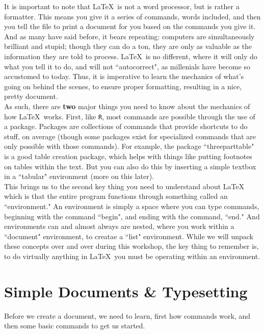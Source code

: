 \documentclass[11pt]{article}
\newcommand{\forceindent}{\leavevmode{\parindent=1.5em\indent}} %
\begin{document}
	It is important to note that \LaTeX\ is not a word processor, but is rather a formatter. This means you give it a series of commands, words included, and then you tell the file to print a document for you based on the commands you give it. And as many have said before, it bears repeating: computers are simultaneously brilliant and stupid; though they can do a ton, they are only as valuable as the information they are told to process. \LaTeX\ is no different, where it will only do what you tell it to do, and will not ``autocorrect", as millenials have become so accustomed to today. Thus, it is imperative to learn the mechanics of what's going on behind the scenes, to ensure proper formatting, resulting in a nice, pretty document. \\

	As such, there are \textbf{two} major things you need to know about the mechanics of how \LaTeX\ works. First, like \texttt{R}, most commands are possible through the use of a package. Packages are collections of commands that provide shortcuts to do stuff, on average (though some packages exist for specialized commands that are only possible with those commands). For example, the package ``threeparttable" is a good table creation package, which helps with things like putting footnotes on tables within the text. But you can also do this by inserting a simple textbox in a ``tabular" environment (more on this later). \\
	
	This brings us to the second key thing you need to understand about \LaTeX\, which is that the entire program functions through something called an ``environment." An environment is simply a space where you can type commands, beginning with the command ``begin", and ending with the command, ``end." And environments can and almost always are nested, where you work within a ``document" environment, to creatae a ``list" environment. While we will unpack these concepts over and over during this workshop, the key thing to remember is, to do virtually anything in \LaTeX\, you must be operating within an environment.

\newpage

\section{Simple Documents \& Typesetting}


	\forceindent Before we create a document, we need to learn, first how commands work, and then some basic commands to get us started. \\
\end{document}
